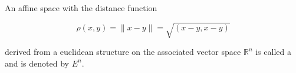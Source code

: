 An affine space with the distance function

$$\rho(x, y) = \|x - y\| = \sqrt{(x - y, x - y)}$$

derived from a euclidean structure on the associated vector space $\mathbb{R}^n$ is called a  and is denoted by $E^n$.
